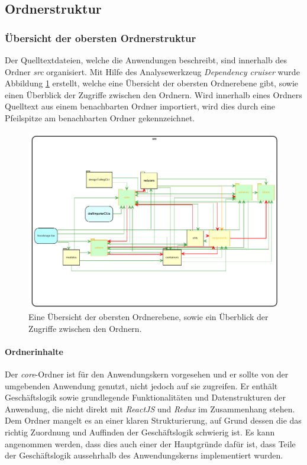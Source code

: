 \subsection{Ordnerstruktur}

\subsubsection{Übersicht der obersten Ordnerstruktur}
Der Quelltextdateien, welche die Anwendungen beschreibt, sind innerhalb des Ordner \emph{src} organisiert. 
Mit Hilfe des Analysewerkzeug \emph{Dependency cruiser} wurde Abbildung \ref{fig:obersteOrdnerebene}  erstellt, welche eine Übersicht der obersten Ordnerebene gibt, sowie einen Überblick der Zugriffe zwischen den Ordnern. Wird innerhalb eines Ordners Quelltext aus einem benachbarten Ordner importiert, wird dies durch eine Pfeilspitze am benachbarten Ordner gekennzeichnet. 

\begin{figure}[H]
	\centering
    \caption{Eine Übersicht der obersten Ordnerebene, sowie ein Überblick der Zugriffe zwischen den Ordnern.}
	\label{fig:obersteOrdnerebene}
	\includegraphics{diagrams/Ist-Architektur/Projektuebersicht.pdf}
\end{figure}

\paragraph{Ordnerinhalte}
Der \emph{core}-Ordner ist für den Anwendungskern vorgesehen und er sollte von der umgebenden Anwendung genutzt, nicht jedoch auf sie zugreifen. Er enthält Geschäftslogik sowie grundlegende Funktionalitäten und Datenstrukturen der Anwendung, die nicht direkt mit \emph{ReactJS} und \emph{Redux} im Zusammenhang stehen. Dem Ordner mangelt es an einer klaren Strukturierung, auf Grund dessen die das richtig Zuordnung und Auffinden der Geschäftslogik schwierig ist. Es kann angenommen werden, dass dies auch einer der Hauptgründe dafür ist, dass Teile der Geschäftslogik aussehrhalb des Anwendungskerns implementiert wurden. 

